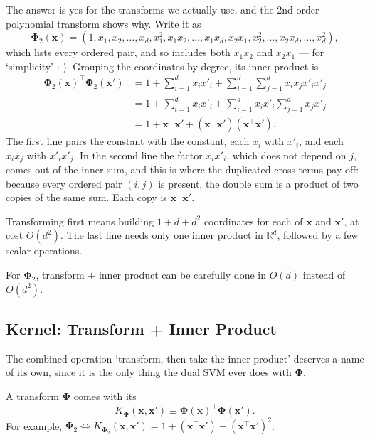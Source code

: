 The answer is yes for the transforms we actually use, and the 2nd order
polynomial transform shows why. Write it as
\[
    \bm{\Phi}_2(\bm{x}) = (1, x_1, x_2, \dots , x_d, x_1^2, x_1 x_2, \dots ,
    x_1 x_d, x_2 x_1, x_2^2, \dots , x_2 x_d, \dots , x_d^2),
\]
which lists every ordered pair, and so includes both \(x_1 x_2\) and
\(x_2 x_1\) --- for `simplicity' :-). Grouping the coordinates by degree,
its inner product is
\[
    \begin{aligned}
        \bm{\Phi}_2(\bm{x})^\top \bm{\Phi}_2(\bm{x}') &= 1 + \sum_{i=1}^d x_i
            x'_i + \sum_{i=1}^d \sum_{j=1}^d x_i x_j x'_i x'_j\\
        &= 1 + \sum_{i=1}^d x_i x'_i + \sum_{i=1}^d x_i x'_i \sum_{j=1}^d x_j
            x'_j\\
        &= 1 + \bm{x}^\top \bm{x}' + (\bm{x}^\top \bm{x}')(\bm{x}^\top
            \bm{x}').
    \end{aligned}
\]
The first line pairs the constant with the constant, each \(x_i\) with
\(x'_i\), and each \(x_i x_j\) with \(x'_i x'_j\). In the second line the
factor \(x_i x'_i\), which does not depend on \(j\), comes out of the inner
sum, and this is where the duplicated cross terms pay off: because every
ordered pair \((i, j)\) is present, the double sum is a product of two copies
of the same sum. Each copy is \(\bm{x}^\top \bm{x}'\).

Transforming first means building \(1 + d + d^2\) coordinates for each of
\(\bm{x}\) and \(\bm{x}'\), at cost \(O(d^2)\). The last line needs only one
inner product in \(\mathbb{R}^d\), followed by a few scalar operations.

\begin{moral}
    For \(\bm{\Phi}_2\), transform \(+\) inner product can be carefully done
    in \(O(d)\) instead of \(O(d^2)\).
\end{moral}

\subsection{Kernel: Transform + Inner Product}

The combined operation `transform, then take the inner product' deserves a
name of its own, since it is the only thing the dual SVM ever does with
\(\bm{\Phi}\).

\begin{definition}
    A transform \(\bm{\Phi}\) comes with its 
    \[
        K_{\bm{\Phi}}(\bm{x}, \bm{x}') \equiv \bm{\Phi}(\bm{x})^\top
        \bm{\Phi}(\bm{x}').
    \]
    For example, \(\bm{\Phi}_2 \iff K_{\bm{\Phi}_2}(\bm{x}, \bm{x}') = 1 +
    (\bm{x}^\top \bm{x}') + (\bm{x}^\top \bm{x}')^2\).
\end{definition}

